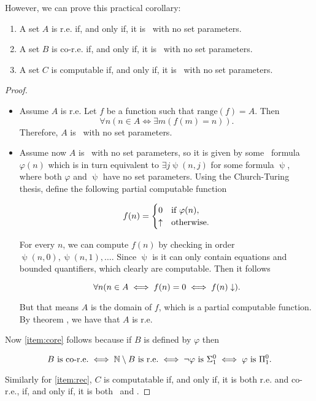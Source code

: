 \documentclass[../main.tex]{memoir}
\begin{document}
However, we can prove this practical corollary:

\begin{corollary}
  \begin{enumerate}[label=(\roman*), ref=(\roman*)]
  \item A set $A$ is r.e. if, and only if, it is \re\ with no set parameters.
  \item \label{item:core} A set $B$ is co-r.e. if, and only if, it is \core\ with no set parameters.
  \item \label{item:rec} A set $C$ is computable if, and only if, it is \rec\ with no set parameters.
  \end{enumerate}
\end{corollary}
\begin{proof}
  \begin{itemize}
  \item Assume $A$ is r.e. Let $f$ be a function such that $\text{range}(f) = A$. Then
    \[ \forall n (n \in A \iff \exists m (f(m) = n)). \]
    Therefore, $A$ is \re\ with no set parameters.
  \item Assume now $A$ is \re\ with no set parameters, so it is given by some \re\ formula $\varphi(n)$ which is in turn equivalent to $\exists j \uppsi(n, j)$ for some  formula $\uppsi$, where both $\varphi$ and $\uppsi$ have no set parameters. Using the Church-Turing thesis, define the following partial computable function

    \[ f(n) =
      \begin{cases}
        0 & \text{if } \varphi(n), \\
        \uparrow & \text{otherwise.}
      \end{cases}
    \]

    For every $n$, we can compute $f(n)$ by checking in order $\uppsi(n, 0), \uppsi(n, 1), \ldots$. Since $\uppsi$ is  it can only contain equations and bounded quantifiers, which clearly are computable. Then it follows

    \[ \forall n (n \in A \iff f(n) = 0 \iff f(n) \downarrow). \]

    But that means $A$ is the domain of $f$, which is a partial computable function. By theorem , we have that $A$ is r.e.
  \end{itemize}

  Now \ref{item:core} follows because if $B$ is defined by $\varphi$ then

  \[ B \text{ is co-r.e.} \iff \mathbb{N} \setminus B \text{ is r.e.} \iff \neg\varphi \text{ is $\Sigma_{1}^{0}$} \iff \varphi \text{ is $\Pi_{1}^{0}$}. \]

  Similarly for \ref{item:rec}, $C$ is computatable if, and only if, it is both r.e. and co-r.e., if, and only if, it is both \re\ and \core.
\end{proof}
\end{document}
